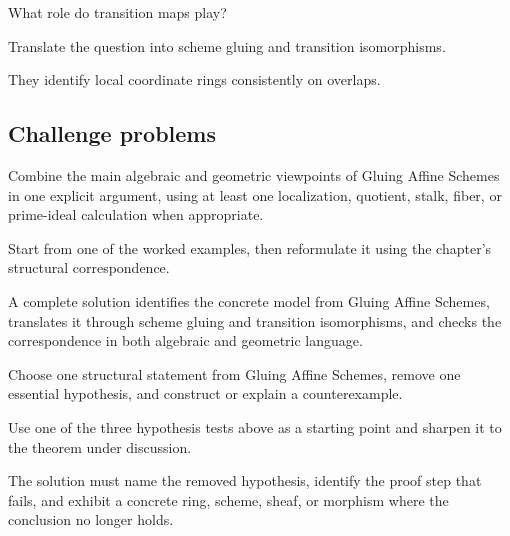 \begin{exercise}\label{exr:vi20-expand-14}
What role do transition maps play?
\end{exercise}
\begin{hint}
Translate the question into scheme gluing and transition isomorphisms.
\end{hint}
\begin{solution}
They identify local coordinate rings consistently on overlaps.
\end{solution}

\subsection*{Challenge problems}

\begin{exercise}\label{exr:vi20-expand-15}
Combine the main algebraic and geometric viewpoints of Gluing Affine Schemes in one explicit argument, using at least one localization, quotient, stalk, fiber, or prime-ideal calculation when appropriate.
\end{exercise}
\begin{hint}
Start from one of the worked examples, then reformulate it using the chapter's structural correspondence.
\end{hint}
\begin{solution}
A complete solution identifies the concrete model from Gluing Affine Schemes, translates it through scheme gluing and transition isomorphisms, and checks the correspondence in both algebraic and geometric language.
\end{solution}

\begin{exercise}\label{exr:vi20-expand-16}
Choose one structural statement from Gluing Affine Schemes, remove one essential hypothesis, and construct or explain a counterexample.
\end{exercise}
\begin{hint}
Use one of the three hypothesis tests above as a starting point and sharpen it to the theorem under discussion.
\end{hint}
\begin{solution}
The solution must name the removed hypothesis, identify the proof step that fails, and exhibit a concrete ring, scheme, sheaf, or morphism where the conclusion no longer holds.
\end{solution}

